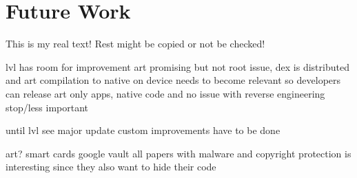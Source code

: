 \section{Future Work}\label{section:conclusion-future}
This is my real text! Rest might be copied or not be checked!


%
lvl has room for improvement
art promising but not root issue, dex is distributed and art compilation to native on device
needs to become relevant so developers can release art only apps, native code and no issue with reverse engineering stop/less important

until lvl see major update custom improvements have to be done
\cite{munteanLicense}
%

art?\newline
smart cards\newline
google vault\newline
all papers with malware and copyright protection is interesting since they also want to hide their code\newline
